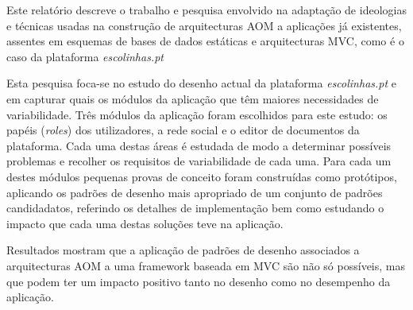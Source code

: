 Este relatório descreve o trabalho e pesquisa envolvido na adaptação de ideologias e técnicas usadas na construção de arquitecturas AOM a aplicações já existentes, assentes em esquemas de bases de dados estáticas e arquitecturas MVC, como é o caso da plataforma \emph{escolinhas.pt}

Esta pesquisa foca-se no estudo do desenho actual da plataforma \emph{escolinhas.pt} e em capturar quais os módulos da aplicação que têm maiores necessidades de variabilidade. Três módulos da aplicação foram escolhidos para este estudo: os papéis (\emph{roles}) dos utilizadores, a rede social e o editor de documentos da plataforma. Cada uma destas áreas é estudada de modo a determinar possíveis problemas e recolher os requisitos de variabilidade de cada uma. Para cada um destes módulos pequenas provas de conceito foram construídas como protótipos, aplicando os padrões de desenho mais apropriado de um conjunto de padrões candidadatos, referindo os detalhes de implementação bem como estudando o impacto que cada uma destas soluções teve na aplicação.

Resultados mostram que a aplicação de padrões de desenho associados a arquitecturas AOM a uma framework baseada em MVC são não só possíveis, mas que podem ter um impacto positivo tanto no desenho como no desempenho da aplicação.
